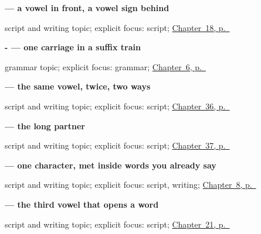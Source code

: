 \noindent\begin{minipage}[t]{\linewidth}
\raggedright
\textbf{ — a vowel in front, a vowel sign behind}\par
\footnotesize script and writing topic; explicit focus: script; \hyperref[ch:ta-telling-time]{Chapter~18, p.~\pageref*{ch:ta-telling-time}}
\end{minipage}\par\smallskip

\noindent\begin{minipage}[t]{\linewidth}
\raggedright
\textbf{- — one carriage in a suffix train}\par
\footnotesize grammar topic; explicit focus: grammar; \hyperref[ch:ta-dative-case]{Chapter~6, p.~\pageref*{ch:ta-dative-case}}
\end{minipage}\par\smallskip

\noindent\begin{minipage}[t]{\linewidth}
\raggedright
\textbf{ — the same vowel, twice, two ways}\par
\footnotesize script and writing topic; explicit focus: script; \hyperref[ch:ta-what-you-are-offered]{Chapter~36, p.~\pageref*{ch:ta-what-you-are-offered}}
\end{minipage}\par\smallskip

\noindent\begin{minipage}[t]{\linewidth}
\raggedright
\textbf{ — the long partner}\par
\footnotesize script and writing topic; explicit focus: script; \hyperref[ch:ta-your-town-your-friend]{Chapter~37, p.~\pageref*{ch:ta-your-town-your-friend}}
\end{minipage}\par\smallskip

\noindent\begin{minipage}[t]{\linewidth}
\raggedright
\textbf{ — one character, met inside words you already say}\par
\footnotesize script and writing topic; explicit focus: script, writing; \hyperref[ch:ta-please]{Chapter~8, p.~\pageref*{ch:ta-please}}
\end{minipage}\par\smallskip

\noindent\begin{minipage}[t]{\linewidth}
\raggedright
\textbf{ — the third vowel that opens a word}\par
\footnotesize script and writing topic; explicit focus: script; \hyperref[ch:ta-dog-and-cat]{Chapter~21, p.~\pageref*{ch:ta-dog-and-cat}}
\end{minipage}\par\smallskip

